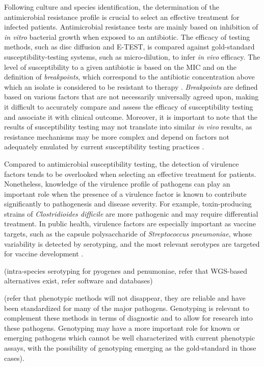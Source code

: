Following culture and species identification, the determination of the antimicrobial resistance profile is crucial to select an effective treatment for infected patients. Antimicrobial resistance tests are mainly based on inhibition of \textit{in vitro} bacterial growth when exposed to an antibiotic. The efficacy of testing methods, such as disc diffusion and E-TEST, is compared against gold-standard susceptibility-testing systems, such as micro-dilution, to infer \textit{in vivo} efficacy.
The level of susceptibility to a given antibiotic is based on the \ac{MIC} and on the definition of \textit{breakpoints}, which correspond to the antibiotic concentration above which an isolate is considered to be resistant to therapy \cite{didelot_transforming_2012}. \textit{Breakpoints} are defined based on various factors that are not necessarily universally agreed upon, making it difficult to accurately compare and assess the efficacy of susceptibility testing and associate it with clinical outcome. Moreover, it is important to note that the results of susceptibility testing may not translate into similar \textit{in vivo} results, as resistance mechanisms may be more complex and depend on factors not adequately emulated by current susceptibility testing practices \cite{didelot_transforming_2012, hassall_limitations_2024}.

Compared to antimicrobial susceptibility testing, the detection of virulence factors tends to be overlooked when selecting an effective treatment for patients. Nonetheless, knowledge of the virulence profile of pathogens can play an important role when the presence of a virulence factor is known to contribute significantly to pathogenesis and disease severity. For example, toxin-producing strains of \textit{Clostridioides difficile} are more pathogenic and may require differential treatment. In public health, virulence factors are especially important as vaccine targets, such as the capsule polysaccharide of \textit{Streptococcus pneumoniae}, whose variability is detected by serotyping, and the most relevant serotypes are targeted for vaccine development \cite{henrichsen_six_1995, tarrago_identification_2008, silva-costa_adult_2023, musher_remarkable_2022}.

(intra-species serotyping for pyogenes and penumoniae, refer that WGS-based alternatives exist, refer software and databases)

(refer that phenotypic methods will not disappear, they are reliable and have been standardized for many of the major pathogens. Genotyping is relevant to complement these methods in terms of diagnostic and to allow for research into these pathogens. Genotyping may have a more important role for known or emerging pathogens which cannot be well characterized with current phenotypic assays, with the possibility of genotyping emerging as the gold-standard in those cases).

